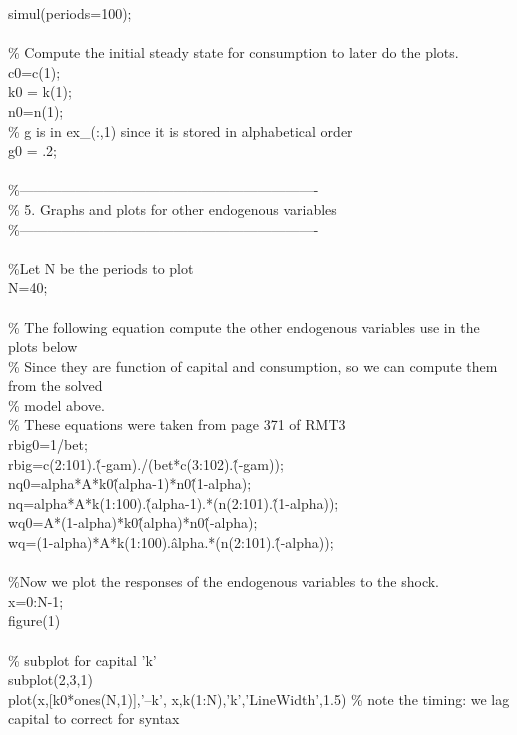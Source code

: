 \documentclass[a4paper,12pt]{scrartcl} %
\begin{document}
simul(periods=100);\\
\\
\% Compute the initial steady state for consumption to later do the plots.\\
c0=c(1);\\
k0 = k(1);\\
n0=n(1);\\
\% g is in ex\_(:,1) since it is stored in alphabetical order\\
g0 = .2;\\
\\
\%----------------------------------------------------------------\\
\% 5. Graphs and plots for other endogenous variables\\
\%----------------------------------------------------------------\\
\\
\%Let N be the periods to plot\\
N=40;\\
\\
\% The following equation compute the other endogenous variables use in the plots below\\
\% Since they are function of capital and consumption, so we can compute them from the solved\\
\% model above.\\
\% These equations were taken from page 371 of RMT3\\
rbig0=1/bet;\\
rbig=c(2:101).\^(-gam)./(bet*c(3:102).\^(-gam));\\
nq0=alpha*A*k0\^(alpha-1)*n0\^(1-alpha);\\
nq=alpha*A*k(1:100).\^(alpha-1).*(n(2:101).\^(1-alpha));\\
wq0=A*(1-alpha)*k0\^(alpha)*n0\^(-alpha);\\
wq=(1-alpha)*A*k(1:100).\^alpha.*(n(2:101).\^(-alpha));\\
\\
\%Now we plot the responses of the endogenous variables to the shock.\\
x=0:N-1;\\
figure(1)\\
\\
\% subplot for capital 'k'\\
subplot(2,3,1)\\
plot(x,[k0*ones(N,1)],'--k', x,k(1:N),'k','LineWidth',1.5) \% note the timing: we lag capital to correct for syntax\\
\end{document}
